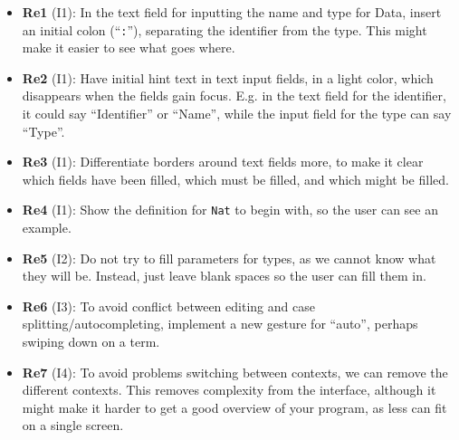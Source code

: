 \begin{itemize}
	\item \textbf{Re1} (I1): In the text field for inputting the name and type for Data, insert an initial colon (``\texttt{:}''), separating the identifier from the type. This might make it easier to see what goes where.
	\item \textbf{Re2} (I1): Have initial hint text in text input fields, in a light color, which disappears when the fields gain focus. E.g. in the text field for the identifier, it could say ``Identifier'' or ``Name'', while the input field for the type can say ``Type''.
	\item \textbf{Re3} (I1): Differentiate borders around text fields more, to make it clear which fields have been filled, which must be filled, and which might be filled.
	\item \textbf{Re4} (I1): Show the definition for \texttt{Nat} to begin with, so the user can see an example.
	\item \textbf{Re5} (I2): Do not try to fill parameters for types, as we cannot know what they will be. Instead, just leave blank spaces so the user can fill them in.
	\item \textbf{Re6} (I3): To avoid conflict between editing and case splitting/autocompleting, implement a new gesture for ``auto'', perhaps swiping down on a term.
	
	\item \textbf{Re7} (I4): To avoid problems switching between contexts, we can remove the different contexts. This removes complexity from the interface, although it might make it harder to get a good overview of your program, as less can fit on a single screen.
\end{itemize}


